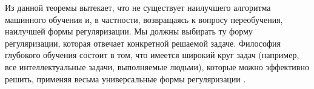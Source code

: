Из данной теоремы вытекает, что не существует наилучшего 
алгоритма машинного обучения и, в частности, возвращаясь к вопросу переобучения, 
наилучшей формы регуляризации. 
Мы должны выбирать ту форму регуляризации, которая отвечает конкретной
решаемой задаче. Философия глубокого обучения
состоит в том, что имеется широкий круг задач (например, все интеллектуальные задачи, 
выполняемые людьми), которые можно эффективно решить, применяя весьма
универсальные формы регуляризации \cite{Goodfellow-et-al-2016}.



